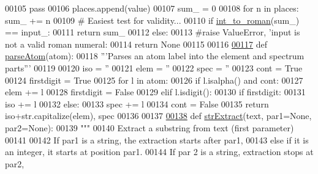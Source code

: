 \begin{DoxyCode}
{{{00105             \textcolor{keywordflow}{pass}
00106         places.append(value)
00107     sum\_ = 0
00108     \textcolor{keywordflow}{for} n \textcolor{keywordflow}{in} places: sum\_ += n
00109     \textcolor{comment}{# Easiest test for validity...}
00110     \textcolor{keywordflow}{if} \hyperlink{namespacepyneb_1_1utils_1_1misc_aec4e973d4cb9299f749ef190ea636a06}{int\_to\_roman}(sum\_) == input\_:
00111         \textcolor{keywordflow}{return} sum\_
00112     \textcolor{keywordflow}{else}:
00113         \textcolor{comment}{#raise ValueError, 'input is not a valid roman numeral: %
00114         \textcolor{keywordflow}{return} \textcolor{keywordtype}{None}
00115       
00116       
\hypertarget{misc_8py_source_l00117}{}\hyperlink{namespacepyneb_1_1utils_1_1misc_a8c069186002a3e73dd474958e35034d5}{00117} \textcolor{keyword}{def }\hyperlink{namespacepyneb_1_1utils_1_1misc_a8c069186002a3e73dd474958e35034d5}{parseAtom}(atom):
00118     \textcolor{stringliteral}{'''Parses an atom label into the element and spectrum parts'''}
00119 
00120     iso = \textcolor{stringliteral}{''}
00121     elem = \textcolor{stringliteral}{''}
00122     spec = \textcolor{stringliteral}{''}
00123     cont = \textcolor{keyword}{True}
00124     firstdigit = \textcolor{keyword}{True}
00125     \textcolor{keywordflow}{for} l \textcolor{keywordflow}{in} atom:
00126         \textcolor{keywordflow}{if} l.isalpha() \textcolor{keywordflow}{and} cont:
00127             elem += l
00128             firstdigit = \textcolor{keyword}{False}
00129         \textcolor{keywordflow}{elif} l.isdigit():
00130             \textcolor{keywordflow}{if} firstdigit:
00131                 iso += l
00132             \textcolor{keywordflow}{else}:
00133                 spec += l
00134                 cont = \textcolor{keyword}{False}
00135     \textcolor{keywordflow}{return} iso+str.capitalize(elem), spec
00136 
00137 
\hypertarget{misc_8py_source_l00138}{}\hyperlink{namespacepyneb_1_1utils_1_1misc_aaf9c5249e3c3104e38854ca30f9df4b7}{00138} \textcolor{keyword}{def }\hyperlink{namespacepyneb_1_1utils_1_1misc_aaf9c5249e3c3104e38854ca30f9df4b7}{strExtract}(text, par1=None, par2=None): 
00139     \textcolor{stringliteral}{"""}
00140 \textcolor{stringliteral}{    Extract a substring from text (first parameter)}
00141 \textcolor{stringliteral}{     }
00142 \textcolor{stringliteral}{    If par1 is a string, the extraction starts after par1,}
00143 \textcolor{stringliteral}{    else if it is an integer, it starts at position par1.}
00144 \textcolor{stringliteral}{    If par 2 is a string, extraction stops at par2, }
}}}}
\end{DoxyCode}
